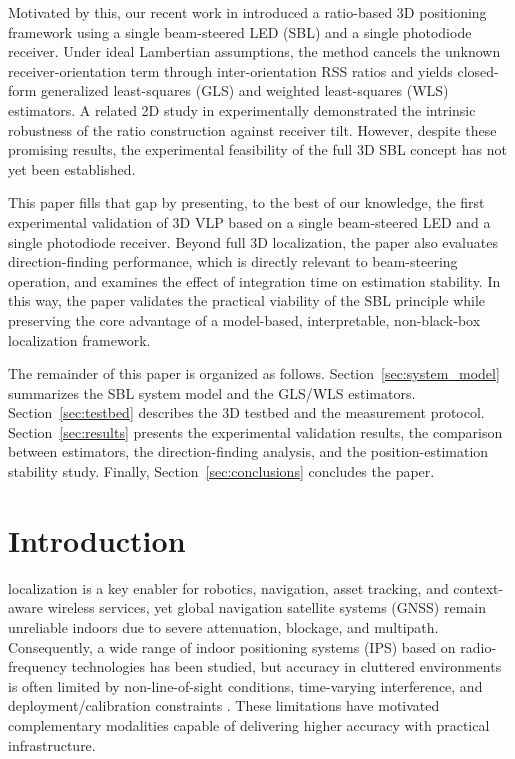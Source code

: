 Motivated by this, our recent work in \cite{acuna2025model} introduced a ratio-based 3D positioning framework using a single beam-steered LED (SBL) and a single photodiode receiver. Under ideal Lambertian assumptions, the method cancels the unknown receiver-orientation term through inter-orientation RSS ratios and yields closed-form generalized least-squares (GLS) and weighted least-squares (WLS) estimators. A related 2D study in \cite{acuna2026robust} experimentally demonstrated the intrinsic robustness of the ratio construction against receiver tilt. However, despite these promising results, the experimental feasibility of the full 3D SBL concept has not yet been established.

This paper fills that gap by presenting, to the best of our knowledge, the first experimental validation of 3D VLP based on a single beam-steered LED and a single photodiode receiver. Beyond full 3D localization, the paper also evaluates direction-finding performance, which is directly relevant to beam-steering operation, and examines the effect of integration time on estimation stability. In this way, the paper validates the practical viability of the SBL principle while preserving the core advantage of a model-based, interpretable, non-black-box localization framework.

The remainder of this paper is organized as follows. Section~\ref{sec:system_model} summarizes the SBL system model and the GLS/WLS estimators. Section~\ref{sec:testbed} describes the 3D testbed and the measurement protocol. Section~\ref{sec:results} presents the experimental validation results, the comparison between estimators, the direction-finding analysis, and the position-estimation stability study. Finally, Section~\ref{sec:conclusions} concludes the paper.


\section{Introduction}

 localization is a key enabler for robotics, navigation, asset tracking, and context-aware wireless services, yet global navigation satellite systems (GNSS) remain unreliable indoors due to severe attenuation, blockage, and multipath. Consequently, a wide range of indoor positioning systems (IPS) based on radio-frequency technologies has been studied, but accuracy in cluttered environments is often limited by non-line-of-sight conditions, time-varying interference, and deployment/calibration constraints \cite{Zafari2019Survey}. These limitations have motivated complementary modalities capable of delivering higher accuracy with practical infrastructure.

